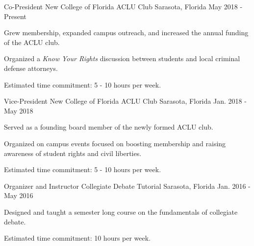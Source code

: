 

\begin{cventries}


  \cventry
    {Co-President} %
    {New College of Florida ACLU Club} %
    {Sarasota, Florida} %
    {May 2018 - Present} %
    {
      \begin{cvitems} %
        \item {Grew membership, expanded campus outreach, and increased the annual funding of the ACLU club.}
        \item {Organized a \emph{Know Your Rights} discussion between students and local criminal defense attorneys.}
        \item {Estimated time commitment: 5 - 10 hours per week.}
      \end{cvitems}
    }

  \cventry
    {Vice-President} %
    {New College of Florida ACLU Club} %
    {Sarasota, Florida} %
    {Jan. 2018 - May 2018} %
    {
      \begin{cvitems} %
        \item {Served as a founding board member of the newly formed ACLU club.}
        \item {Organized on campus events focused on boosting membership and raising awareness of student rights and civil liberties.}
        \item {Estimated time commitment: 5 - 10 hours per week.}
      \end{cvitems}
    }

  \cventry
    {Organizer and Instructor} %
    {Collegiate Debate Tutorial} %
    {Sarasota, Florida} %
    {Jan. 2016 - May 2016} %
    {
      \begin{cvitems} %
        \item {Designed and taught a semester long course on the fundamentals of collegiate debate.}
        \item {Estimated time commitment: 10 hours per week.}
      \end{cvitems}
    }


\end{cventries}
